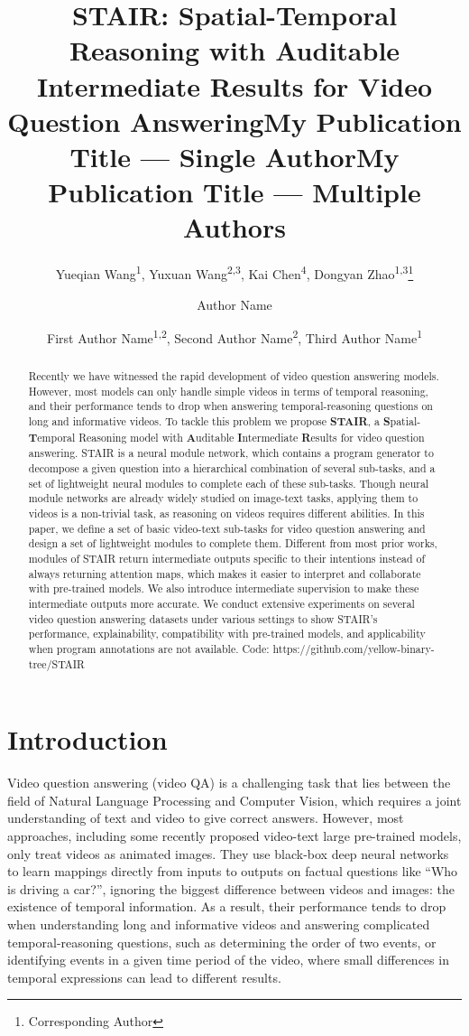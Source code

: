 \documentclass[letterpaper]{article} %
\title{STAIR: Spatial-Temporal Reasoning with Auditable Intermediate Results for Video Question Answering}
\author{
    Yueqian Wang\textsuperscript{\rm 1},
    Yuxuan Wang\textsuperscript{\rm 2,3},
    Kai Chen\textsuperscript{\rm 4},
    Dongyan Zhao\textsuperscript{\rm 1,3}\thanks{Corresponding Author}
}
\title{My Publication Title --- Single Author}
\author {
    Author Name
}
\title{My Publication Title --- Multiple Authors}
\author {
    First Author Name\textsuperscript{\rm 1,\rm 2},
    Second Author Name\textsuperscript{\rm 2},
    Third Author Name\textsuperscript{\rm 1}
}
\begin{document}
\maketitle

\begin{abstract}
Recently we have witnessed the rapid development of video question answering models. However, most models can only handle simple videos in terms of temporal reasoning, and their performance tends to drop when answering temporal-reasoning questions on long and informative videos.
To tackle this problem we propose \textbf{STAIR}, a \textbf{S}patial-\textbf{T}emporal Reasoning model with \textbf{A}uditable \textbf{I}ntermediate \textbf{R}esults for video question answering. STAIR is a neural module network, which contains a program generator to decompose a given question into a hierarchical combination of several sub-tasks, and a set of lightweight neural modules to complete each of these sub-tasks.
Though neural module networks are already widely studied on image-text tasks, applying them to videos is a non-trivial task, as reasoning on videos requires different abilities. In this paper, we define a set of basic video-text sub-tasks for video question answering and design a set of lightweight modules to complete them.
Different from most prior works, modules of STAIR return intermediate outputs specific to their intentions instead of always returning attention maps, which makes it easier to interpret and collaborate with pre-trained models. We also introduce intermediate supervision to make these intermediate outputs more accurate. We conduct extensive experiments on several video question answering datasets under various settings to show STAIR's performance, explainability, compatibility with pre-trained models, and applicability when program annotations are not available. Code: https://github.com/yellow-binary-tree/STAIR
\end{abstract}


\section{Introduction}
Video question answering (video QA) is a challenging task that lies between the field of Natural Language Processing and Computer Vision, which requires a joint understanding of text and video to give correct answers.
However, most approaches, including some recently proposed video-text large pre-trained models, only treat videos as animated images. They use black-box deep neural networks to learn mappings directly from inputs to outputs on factual questions like ``Who is driving a car?'', ignoring the biggest difference between videos and images: the existence of temporal information. As a result, their performance tends to drop when understanding long and informative videos and answering complicated temporal-reasoning questions, such as determining the order of two events, or identifying events in a given time period of the video, where small differences in temporal expressions can lead to different results.
\end{document}
